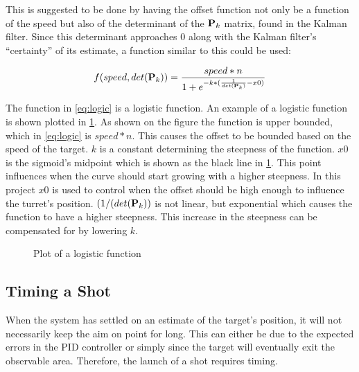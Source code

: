 This is suggested to be done by having the offset function not only be a function of the speed but also of the determinant of the $\mathbf{P}_k$ matrix, found in the Kalman filter. Since this determinant approaches 0 along with the Kalman filter's \enquote{certainty} of its estimate, a function similar to this could be used:

\begin{equation}
  f(speed,det(\mathbf{P}_k)) = \frac{speed*n}{1+e^{-k*(\frac{1}{det(\mathbf{P}_k)}-x0)}}
\label{eq:logic}
\end{equation}

The function in \cref{eq:logic} is a logistic function. An example of a logistic function is shown plotted in \cref{fig:logic}. As shown on the figure the function is upper bounded, which in \cref{eq:logic} is $speed*n$. This causes the offset to be bounded based on the speed of the target. $k$ is a constant determining the steepness of the function. $x0$ is the sigmoid's midpoint which is shown as the black line in \cref{fig:logic}. This point influences when the curve should start growing with a higher steepness. In this project $x0$ is used to control when the offset should be high enough to influence the turret's position. $(1/(det(\mathbf{P}_k))$ is not linear, but exponential which causes the function to have a higher steepness. This increase in the steepness can be compensated for by lowering $k$. 


\begin{figure}[H]
\centering
{}
\caption{Plot of a logistic function}
\label{fig:logic}
\end{figure}

\subsection{Timing a Shot}
When the system has settled on an estimate of the target's position, it will not necessarily keep the aim on point for long. This can either be due to the expected errors in the PID controller or simply since the target will eventually exit the observable area. Therefore, the launch of a shot requires timing. 

